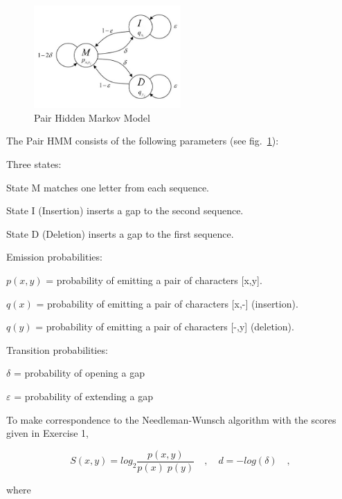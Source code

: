 \documentclass[a4paper,11pt]{article}
\begin{document}
\begin{figure}[h]
\begin{center}
\includegraphics[width=0.5\textwidth]{HMM.jpg}
\caption{Pair Hidden Markov Model}
\label{fig:HMM}
\end{center}
\end{figure}


The Pair HMM consists of the following parameters (see fig.~\ref{fig:HMM}):

\vspace{0.5cm}

Three states:

State M matches one letter from each sequence.

State I (Insertion) inserts a gap to the second sequence.

State D (Deletion) inserts a gap to the first sequence.

\vspace{0.5cm}

Emission probabilities:

$p(x,y)$ = probability of emitting a pair of characters {[}x,y{]}.

$q(x)$ = probability of emitting a pair of characters {[}x,-{]} (insertion).

$q(y)$ = probability of emitting a pair of characters {[}-,y{]} (deletion).

\vspace{0.5cm}

Transition probabilities:

$\delta$ = probability of opening a gap

$\varepsilon$ = probability of extending a gap

\vspace{0.5cm}

To make correspondence to the Needleman-Wunsch algorithm with the scores given in Exercise 1,


$$S(x,y)=log_2\frac{p(x,y)}{p(x)\; p(y)} \quad , \quad d=-log(\delta) \quad ,$$


where
\end{document}
